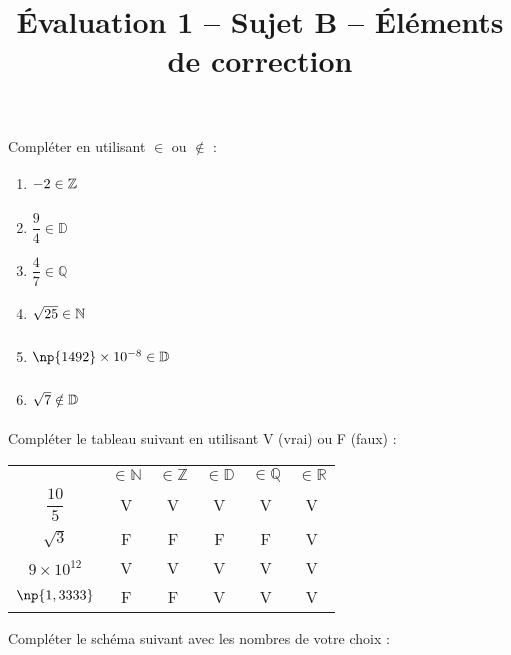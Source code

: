 \documentclass[a4paper,dvipsnames]{article}
\begin{document}
\title{Évaluation 1 -- Sujet B -- Éléments de correction}

\pagestyle{empty}

\date{}
\author{}

\maketitle{}

\setcounter{exercice}{1}

\exo[3 points]
Compléter en utilisant $\in$ ou $\notin$ :
\begin{multicols}{3}
  \begin{enumerate}
    \item $-2\in\mathbb{Z}\vphantom{\dfrac{1}{3}}$
    \item $\dfrac{9}{4}\in\mathbb{D}$
    \item $\dfrac{4}{7}\in\mathbb{Q}$
    \item $\sqrt{25}\in\mathbb{N}\vphantom{\dfrac{9}{4}}$
    \item $\np{1492}\times10^{-8}\in\mathbb{D}\vphantom{\dfrac{1}{3}}$
    \item $\sqrt{7}\notin\mathbb{D}\vphantom{\dfrac{1}{3}}$
  \end{enumerate}
\end{multicols}

\bigskip

\exo[2 points]
Compléter le tableau suivant en utilisant V (vrai) ou F (faux) :
\begin{center}
  \begin{tabular}{@{}cccccc@{}}
    \toprule
    & $\in\mathbb{N}$ & $\in\mathbb{Z}$ & $\in\mathbb{D}$ & $\in\mathbb{Q}$ & $\in\mathbb{R}$\\
    \cmidrule(lr){2-6}
    $\dfrac{10}{5}$ & V & V & V & V & V\\
    \addlinespace[2mm]
    $\sqrt{3}$ & F & F & F & F & V\\
    \addlinespace[1mm]
    $9\times10^{12}$ & V & V & V & V & V\\
    \addlinespace[1mm]
    $\np{1,3333}$ & F & F & V & V & V\\
    \bottomrule
  \end{tabular}
\end{center}

\bigskip

\exo[2 points] Compléter le schéma suivant avec les nombres de votre choix :
\end{document}
